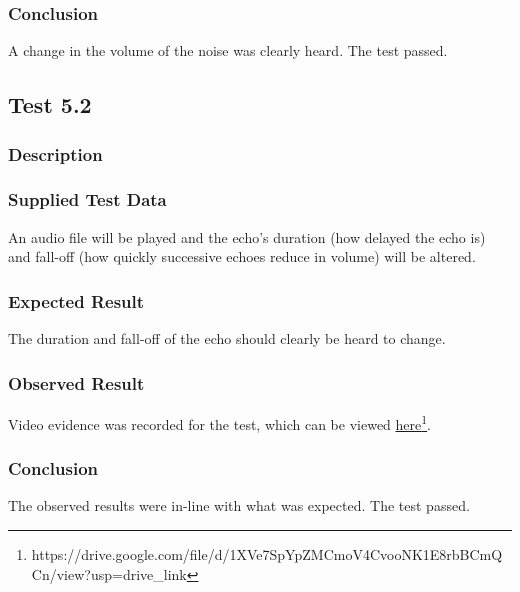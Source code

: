 \subsubsection*{Conclusion}
A change in the volume of the noise was clearly heard. The test passed.


\pagebreak
\subsection{Test 5.2}
\subsubsection*{Description}
\paragraph{}
{
	\centering
}

\subsubsection*{Supplied Test Data}
An audio file will be played and the echo's duration (how delayed the echo is) and fall-off (how quickly successive echoes reduce in volume) will be altered.

\subsubsection*{Expected Result}
The duration and fall-off of the echo should clearly be heard to change.

\subsubsection*{Observed Result}
\label{sec:evidence5.2}
Video evidence was recorded for the test, which can be viewed \href{https://drive.google.com/file/d/1XVe7SpYpZMCmoV4CvooNK1E8rbBCmQCn/view?usp=drive_link}{here}\footnote{
	https://drive.google.com/file/d/1XVe7SpYpZMCmoV4CvooNK1E8rbBCmQCn/view?usp=drive\_link
}.

\subsubsection*{Conclusion}
The observed results were in-line with what was expected. The test passed.


